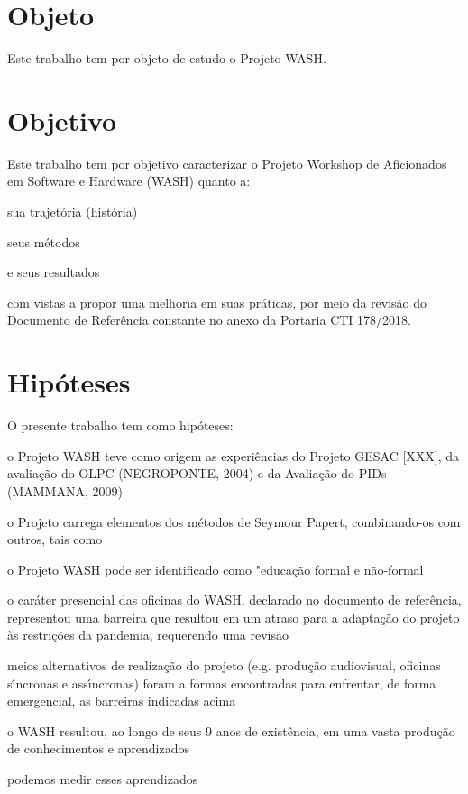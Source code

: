 \documentclass[
12pt,		%
openright,	%
twoside,  %
a4paper,			%
chapter=TITLE,		%
english,			%
french,				%
spanish,			%
brazil				%
]{USPSC-classe/USPSC}
\begin{document}
\section[Objeto]{Objeto}\label{Objeto}
Este trabalho tem por objeto de estudo o  Projeto WASH.


\section[Objetivo]{Objetivo}\label{Objetivo}
Este trabalho tem por objetivo caracterizar  o Projeto Workshop de Aficionados em Software e Hardware (WASH) quanto a:



\begin{alineas}
\item sua trajet\'oria (hist\'oria)
\item seus m\'etodos
\item e seus resultados
\end{alineas}

com vistas a propor uma melhoria em suas pr\'aticas, por meio da revis\~ao do Documento de Refer\^encia constante no anexo da Portaria CTI 178/2018.


\section[Hip\'oteses]{Hip\'oteses}\label{Hip\'oteses}
O presente trabalho tem como hip\'oteses:



\begin{alineas}
\item o Projeto WASH teve como origem as experi\^encias do Projeto GESAC [XXX], da avalia\c{c}\~ao do OLPC (NEGROPONTE, 2004) e da Avalia\c{c}\~ao do PIDs (MAMMANA, 2009)
\item o Projeto carrega elementos dos m\'etodos de Seymour Papert, combinando-os com outros, tais como
\item o Projeto WASH pode ser identificado como "educa\c{c}\~ao  formal e n\~ao-formal
\item o car\'ater presencial das oficinas do WASH, declarado no documento de refer\^encia, representou uma barreira que resultou em um atraso para a adapta\c{c}\~ao do projeto \`as restri\c{c}\~oes da pandemia, requerendo uma revis\~ao
\item meios alternativos de realiza\c{c}\~ao do projeto (e.g. produ\c{c}\~ao audiovisual, oficinas s\'{\i}ncronas e ass\'{\i}ncronas) foram a formas encontradas para enfrentar, de forma emergencial, as barreiras indicadas acima
\item o WASH resultou, ao longo de seus 9 anos de exist\^encia, em uma vasta produ\c{c}\~ao de conhecimentos e aprendizados
\item podemos medir  esses aprendizados 
\end{alineas}
\end{document}
